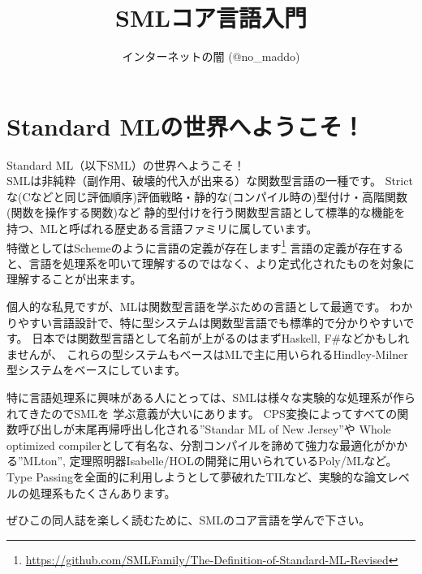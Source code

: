 \documentclass[11pt,a4paper]{jarticle}
\title{SMLコア言語入門}
\author{インターネットの闇 (@no\_maddo)}
\begin{document}
\maketitle

\setlength{\parskip}{0.1cm}

\newcommand{\prog}[1]{\colorbox[gray]{0.7}{\lstinline{#1}}}
\newcommand{\sml}[1]{\lstinline{#1}}



\section{Standard MLの世界へようこそ！}

Standard ML（以下SML）の世界へようこそ！\\
SMLは非純粋（副作用、破壊的代入が出来る）な関数型言語の一種です。
Strictな(Cなどと同じ評価順序)評価戦略・静的な(コンパイル時の)型付け・高階関数(関数を操作する関数)など
静的型付けを行う関数型言語として標準的な機能を持つ、MLと呼ばれる歴史ある言語ファミリに属しています。\\
特徴としてはSchemeのように言語の定義が存在します\footnote{\url{https://github.com/SMLFamily/The-Definition-of-Standard-ML-Revised}}
言語の定義が存在すると、言語を処理系を叩いて理解するのではなく、より定式化されたものを対象に理解することが出来ます。

個人的な私見ですが、MLは関数型言語を学ぶための言語として最適です。
わかりやすい言語設計で、特に型システムは関数型言語でも標準的で分かりやすいです。
日本では関数型言語として名前が上がるのはまずHaskell, F\#などかもしれませんが、
これらの型システムもベースはMLで主に用いられるHindley-Milner型システムをベースにしています。

特に言語処理系に興味がある人にとっては、SMLは様々な実験的な処理系が作られてきたのでSMLを
学ぶ意義が大いにあります。
CPS変換によってすべての関数呼び出しが末尾再帰呼出し化される''Standar ML of New Jersey''や
Whole optimized compilerとして有名な、分割コンパイルを諦めて強力な最適化がかかる''MLton'',
定理照明器Isabelle/HOLの開発に用いられているPoly/MLなど。
Type Passingを全面的に利用しようとして夢破れたTILなど、実験的な論文レベルの処理系もたくさんあります。

ぜひこの同人誌を楽しく読むために、SMLのコア言語を学んで下さい。
\end{document}
